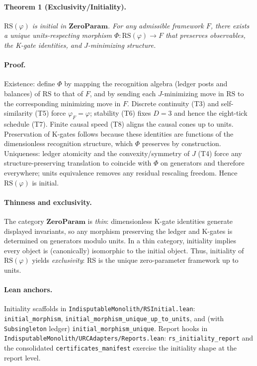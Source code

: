 \documentclass[11pt]{article}
\begin{document}
\paragraph{Theorem 1 (Exclusivity/Initiality).} \emph{\(\mathrm{RS}(\varphi)\) is initial in \(\mathbf{ZeroParam}\). For any admissible framework \(F\), there exists a unique units\mbox{-}respecting morphism \(\Phi\colon \mathrm{RS}(\varphi)\to F\) that preserves observables, the K\mbox{-}gate identities, and \(J\)\mbox{-}minimizing structure.}

\paragraph{Proof.} Existence: define \(\Phi\) by mapping the recognition algebra (ledger posts and balances) of \(\mathrm{RS}\) to that of \(F\), and by sending each \(J\)\mbox{-}minimizing move in \(\mathrm{RS}\) to the corresponding minimizing move in \(F\). Discrete continuity (T3) and self\mbox{-}similarity (T5) force \(\varphi_F=\varphi\); stability (T6) fixes \(D=3\) and hence the eight\mbox{-}tick schedule (T7). Finite causal speed (T8) aligns the causal cones up to units. Preservation of K\mbox{-}gates follows because these identities are functions of the dimensionless recognition structure, which \(\Phi\) preserves by construction. Uniqueness: ledger atomicity and the convexity/symmetry of \(J\) (T4) force any structure\mbox{-}preserving translation to coincide with \(\Phi\) on generators and therefore everywhere; units equivalence removes any residual rescaling freedom. Hence \(\mathrm{RS}(\varphi)\) is initial.

\paragraph{Thinness and exclusivity.} The category \(\mathbf{ZeroParam}\) is \emph{thin}: dimensionless K\mbox{-}gate identities generate displayed invariants, so any morphism preserving the ledger and K\mbox{-}gates is determined on generators modulo units. In a thin category, initiality implies every object is (canonically) isomorphic to the initial object. Thus, initiality of \(\mathrm{RS}(\varphi)\) yields \emph{exclusivity}: RS is the unique zero\mbox{-}parameter framework up to units.

\paragraph{Lean anchors.} Initiality scaffolds in \texttt{IndisputableMonolith/RSInitial.lean}: \texttt{initial\_morphism}, \texttt{initial\_morphism\_unique\_up\_to\_units}, and (with \texttt{Subsingleton} ledger) \texttt{initial\_morphism\_unique}. Report hooks in \texttt{IndisputableMonolith/URCAdapters/Reports.lean}: \texttt{rs\_initiality\_report} and the consolidated \texttt{certificates\_manifest} exercise the initiality shape at the report level.
\end{document}
